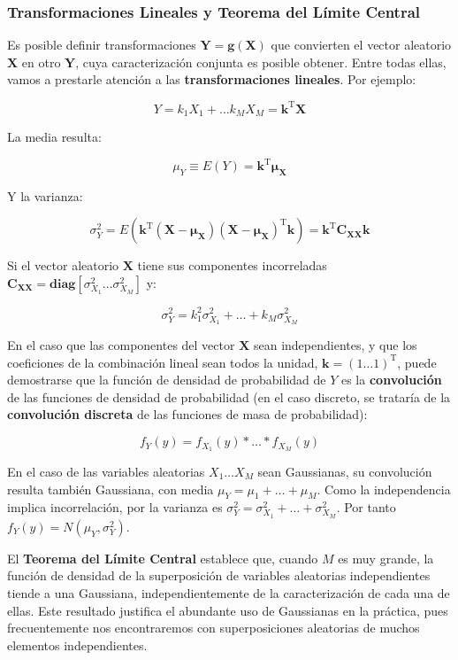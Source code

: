 \documentclass[11pt]{article}
\begin{document}
    \hypertarget{transformaciones-lineales-y-teorema-del-luxedmite-central}{%
\subsubsection{Transformaciones Lineales y Teorema del Límite
Central}\label{transformaciones-lineales-y-teorema-del-luxedmite-central}}

Es posible definir transformaciones \(\mathbf{Y} = \mathbf{g(X)}\) que
convierten el vector aleatorio \(\mathbf{X}\) en otro \(\mathbf{Y}\),
cuya caracterización conjunta es posible obtener. Entre todas ellas,
vamos a prestarle atención a las \textbf{transformaciones lineales}. Por
ejemplo:

\[Y = k_1 X_1 + \ldots k_M X_M = \mathbf{k}^\mathrm{T}\mathbf{X}\]

La media resulta:

\[
\mu_Y \equiv E(Y) = \mathbf{k}^\mathrm{T}\boldsymbol{\mu}_\mathbf{X}
\]

Y la varianza:

\[
\sigma_{Y}^2 = E\left(\mathbf{k}^\mathrm{T}(\mathbf{X}-\boldsymbol{\mu}_\mathbf{X}) (\mathbf{X}-\boldsymbol{\mu}_\mathbf{X} )^\mathrm{T}\mathbf{k}
\right)
= \mathbf{k}^\mathrm{T}\mathbf{C_{XX}}\mathbf{k}
\]

Si el vector aleatorio \(\mathbf{X}\) tiene sus componentes incorreladas
\(\mathbf{C_{XX}} = \mathrm{\mathbf{diag}}[\sigma_{X_1}^2\ldots \sigma_{X_M}^2]\)
y:

\[
\sigma_{Y}^2 = k_1^2\sigma_{X_1}^2 + \ldots + k_M\sigma_{X_M}^2
\]

    En el caso que las componentes del vector \(\mathbf{X}\) sean
independientes, y que los coeficiones de la combinación lineal sean
todos la unidad, \(\mathbf{k}=(1 \ldots 1)^\mathrm{T}\), puede
demostrarse que la función de densidad de probabilidad de \(Y\) es la
\textbf{convolución} de las funciones de densidad de probabilidad (en el
caso discreto, se trataría de la \textbf{convolución discreta} de las
funciones de masa de probabilidad):

\[
f_Y(y) = f_{X_1}(y)* \ldots * f_{X_M}(y)
\]

En el caso de las variables aleatorias \(X_1 \ldots X_M\) sean
Gaussianas, su convolución resulta también Gaussiana, con media
\(\mu_Y = \mu_1 + \ldots + \mu_M\). Como la independencia implica
incorrelación, por la varianza es
\(\sigma_{Y}^2 = \sigma_{X_1}^2 + \ldots + \sigma_{X_M}^2\). Por tanto
\(f_Y(y) = N(\mu_Y, \sigma_Y^2)\).

El \textbf{Teorema del Límite Central} establece que, cuando \(M\) es
muy grande, la función de densidad de la superposición de variables
aleatorias independientes tiende a una Gaussiana, independientemente de
la caracterización de cada una de ellas. Este resultado justifica el
abundante uso de Gaussianas en la práctica, pues frecuentemente nos
encontraremos con superposiciones aleatorias de muchos elementos
independientes.
\end{document}
